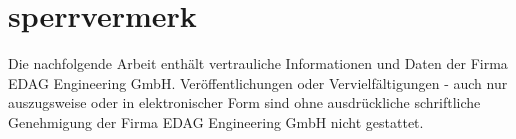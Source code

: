 \section*{sperrvermerk}
\label{sec:sperrvermerk}

Die nachfolgende Arbeit enthält vertrauliche Informationen und Daten der Firma
EDAG Engineering GmbH.
Veröffentlichungen oder Vervielfältigungen - auch nur auszugsweise oder in elektronischer
Form sind ohne ausdrückliche schriftliche Genehmigung der Firma EDAG Engineering GmbH
nicht gestattet.